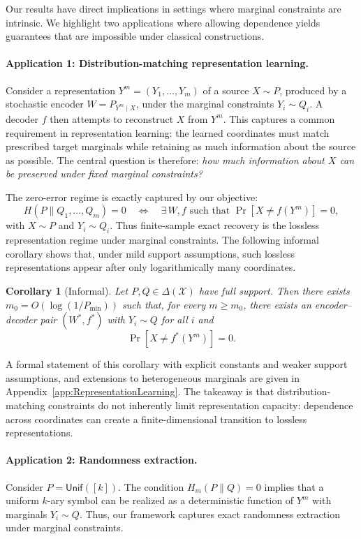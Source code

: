 \documentclass[journal]{IEEEtran}
\newtheorem{corollary}{Corollary}
\def\calX{{\mathcal X}}
\newcommand{\1}{\mathbf{1}}
\newcommand{\Unif}{\mathsf{Unif}}
\begin{document}
Our results have direct implications in settings where marginal constraints are intrinsic. We highlight two applications where allowing dependence yields guarantees that are impossible under classical constructions.
\paragraph{Application 1: Distribution-matching representation learning.}
Consider a representation \(Y^m=(Y_1,\ldots,Y_m)\) of a source \(X\sim P\),
produced by a stochastic encoder \(W=P_{Y^m\mid X}\), under the marginal
constraints \(Y_i\sim Q_i\). A decoder \(f\) then attempts to reconstruct
\(X\) from \(Y^m\). This
captures a common requirement in representation learning: the learned
coordinates must match prescribed target marginals while retaining as much
information about the source as possible. The central question is therefore:
\emph{how much information about \(X\) can be preserved under fixed marginal
constraints?}

The zero-error regime is exactly captured by our objective:
\[
H(P\|Q_1,\ldots,Q_m)=0
\quad\Longleftrightarrow\quad
\exists\, W,f \text{ such that } \Pr[X\neq f(Y^m)]=0,
\]
with \(X\sim P\) and \(Y_i\sim Q_i\). Thus finite-sample exact recovery is the
lossless representation regime under marginal constraints. The following
informal corollary shows that, under mild support assumptions, such lossless
representations appear after only logarithmically many coordinates.

\begin{corollary}[Informal]
Let \(P,Q\in\Delta(\calX)\) have full support. Then there exists
\(m_0=O(\log(1/P_{\min}))\) such that, for every \(m\ge m_0\), there exists an encoder--decoder pair  \((W^*,f^*)\)  with \(Y_i\sim Q\) for all \(i\) and
\[\Pr[X\neq f^*(Y^m)] = 0.\]
\end{corollary}

A formal statement of this corollary with explicit constants and weaker support assumptions, and extensions to heterogeneous marginals are given in Appendix~\ref{app:RepresentationLearning}. The takeaway is that
distribution-matching constraints do not inherently limit representation
capacity: dependence across coordinates can create a finite-dimensional
transition to lossless representations.






\paragraph{Application 2: Randomness extraction.}
Consider $P=\Unif([k])$. The condition $H_m(P\|Q)=0$ implies that a uniform $k$-ary symbol can be realized as a deterministic function of $Y^m$ with marginals $Y_i\sim Q$. Thus, our framework captures exact randomness extraction under marginal constraints.
\end{document}

